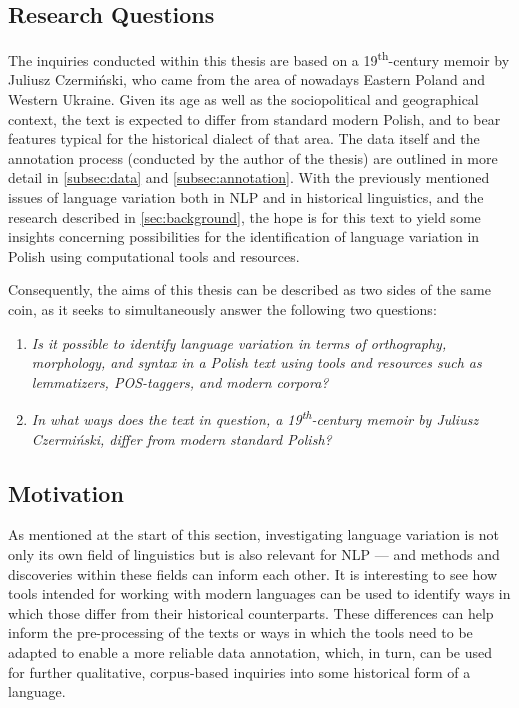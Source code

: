 \subsection{Research Questions}
\label{subsec:research-questions}

The inquiries conducted within this thesis are based on a 19\textsuperscript{th}-century memoir by Juliusz Czermiński, who came from the area of nowadays Eastern Poland and Western Ukraine. Given its age as well as the sociopolitical and geographical context, the text is expected to differ from standard modern Polish, and to bear features typical for the historical dialect of that area. The data itself and the annotation process (conducted by the author of the thesis) are outlined in more detail in \autoref{subsec:data} and \autoref{subsec:annotation}. With the previously mentioned issues of language variation both in NLP and in historical linguistics, and the research described in \autoref{sec:background}, the hope is for this text to yield some insights concerning possibilities for the identification of language variation in Polish using computational tools and resources. 

Consequently, the aims of this thesis can be described as two sides of the same coin, as it seeks to simultaneously answer the following two questions:
\begin{enumerate}
    \item \textit{Is it possible to identify language variation in terms of orthography, morphology, and syntax in a Polish text using tools and resources such as lemmatizers, POS-taggers, and modern corpora?}
    \item \textit{In what ways does the text in question, a 19\textsuperscript{th}-century memoir by Juliusz Czermiński, differ from modern standard Polish?}
\end{enumerate}

\subsection{Motivation}
\label{subsec:motivation}

As mentioned at the start of this section, investigating language variation is not only its own field of linguistics but is also relevant for NLP --- and methods and discoveries within these fields can inform each other. It is interesting to see how tools intended for working with modern languages can be used to identify ways in which those differ from their historical counterparts. These differences can help inform the pre-processing of the texts or ways in which the tools need to be adapted to enable a more reliable data annotation, which, in turn, can be used for further qualitative, corpus-based inquiries into some historical form of a language. 

